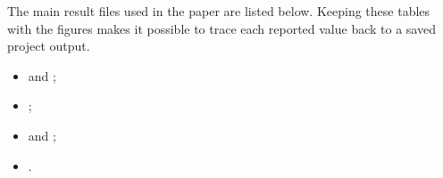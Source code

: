 \documentclass[11pt,a4paper]{article}
\begin{document}
The main result files used in the paper are listed below. Keeping these tables
with the figures makes it possible to trace each reported value back to a saved
project output.

\begin{itemize}
  \item {} and
    ;
  \item {};
  \item {} and
    ;
  \item {}.
\end{itemize}
\end{document}
